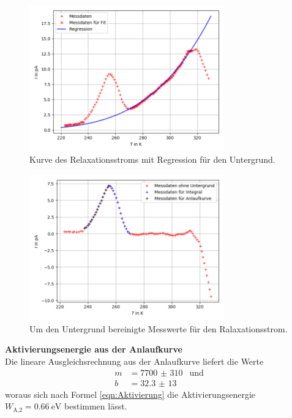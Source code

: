 \begin{figure}[H]
  \centering
  \includegraphics[width=0.75\textwidth]{Dipol2mitUntergrund.png}
  \caption{Kurve des Relaxationsstroms mit Regression für den Untergrund.}
  \label{fig:Abb1}
\end{figure}

\begin{figure}[H]
  \centering
  \includegraphics[width=0.75\textwidth]{Dipol2ohneUntergrund.png}
  \caption{Um den Untergrund bereinigte Messwerte für den Ralaxationsstrom.}
  \label{fig:Abb2}
\end{figure}

\newpage

\textbf{Aktivierungsenergie aus der Anlaufkurve}\\
Die lineare Ausgleichsrechnung aus der Anlaufkurve liefert die Werte
\begin{align*}
  m&=\SI{7700(310)}{}\;\; \text{und}\\
  b&=\SI{32,3(13)}{}
\end{align*}
woraus sich nach Formel \ref{eqn:Aktivierung} die Aktivierungsenergie $W_\text{A,2}=\SI{0,66}{\eV}$
bestimmen lässt.

